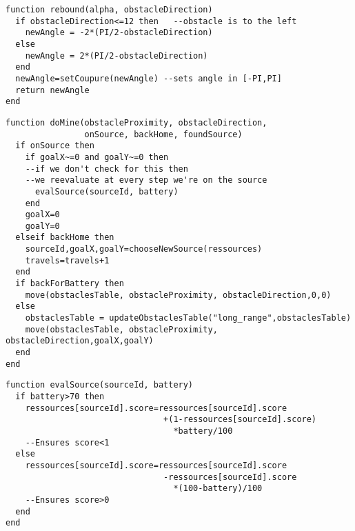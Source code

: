 \begin{subappendices}
\begin{lstlisting}[caption=Déplacement \emph{gaslike}]
function rebound(alpha, obstacleDirection)
  if obstacleDirection<=12 then   --obstacle is to the left
    newAngle = -2*(PI/2-obstacleDirection)
  else
    newAngle = 2*(PI/2-obstacleDirection)
  end
  newAngle=setCoupure(newAngle) --sets angle in [-PI,PI]
  return newAngle
end
\end{lstlisting}


\begin{lstlisting}[caption=fonction doMine]
function doMine(obstacleProximity, obstacleDirection,
                onSource, backHome, foundSource)
  if onSource then
    if goalX~=0 and goalY~=0 then
    --if we don't check for this then
    --we reevaluate at every step we're on the source
      evalSource(sourceId, battery)
    end
    goalX=0
    goalY=0
  elseif backHome then
    sourceId,goalX,goalY=chooseNewSource(ressources)
    travels=travels+1
  end
  if backForBattery then
    move(obstaclesTable, obstacleProximity, obstacleDirection,0,0)
  else
    obstaclesTable = updateObstaclesTable("long_range",obstaclesTable)
    move(obstaclesTable, obstacleProximity, obstacleDirection,goalX,goalY)
  end
end
\end{lstlisting}

\begin{lstlisting}[caption=Evaluation de la qualité de la source]
function evalSource(sourceId, battery)
  if battery>70 then
    ressources[sourceId].score=ressources[sourceId].score
                                +(1-ressources[sourceId].score)
                                  *battery/100
    --Ensures score<1
  else
    ressources[sourceId].score=ressources[sourceId].score
                                -ressources[sourceId].score
                                  *(100-battery)/100
    --Ensures score>0
  end
end
\end{lstlisting}



\end{subappendices}
